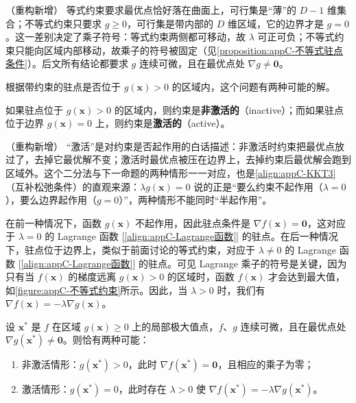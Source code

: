 \documentclass[../main.tex]{subfiles}
\begin{document}
\begin{remark}（重构新增）
等式约束要求最优点恰好落在曲面上，可行集是“薄”的 $D-1$ 维集合；不等式约束只要求 $g\geqslant0$，可行集是带内部的 $D$ 维区域，它的边界才是 $g=0$。这一差别决定了乘子符号：等式约束两侧都可移动，故 $\lambda$ 可正可负；不等式约束只能向区域内部移动，故乘子的符号被固定（见\cref{proposition:appC-不等式驻点条件}）。后文所有结论都要求 $g$ 连续可微，且在最优点处 $\nabla g\neq\bm{0}$。
\end{remark}

根据带约束的驻点是否位于 $g(\bm{x})>0$ 的区域内，这个问题有两种可能的解。

\begin{definition}[激活约束与非激活约束]\label{definition:appC-激活约束}
如果驻点位于 $g(\bm{x})>0$ 的区域内，则约束是\textbf{非激活的}（inactive）；而如果驻点位于边界 $g(\bm{x})=0$ 上，则约束是\textbf{激活的}（active）。
\end{definition}

\begin{remark}（重构新增）
“激活”是对约束是否起作用的白话描述：非激活时约束把最优点放过了，去掉它最优解不变；激活时最优点被压在边界上，去掉约束后最优解会跑到区域外。这个二分法与下一命题的两种情形一一对应，也是\eqref{align:appC-KKT3}（互补松弛条件）的直观来源：$\lambda g(\bm{x})=0$ 说的正是“要么约束不起作用（$\lambda=0$），要么边界起作用（$g=0$）”，两种情形不能同时“半起作用”。
\end{remark}

在前一种情况下，函数 $g(\bm{x})$ 不起作用，因此驻点条件是 $\nabla f(\bm{x})=\bm{0}$，这对应于 $\lambda=0$ 的 Lagrange 函数 [\eqref{align:appC-Lagrange函数}] 的驻点。在后一种情况下，驻点位于边界上，类似于前面讨论的等式约束，对应于 $\lambda\neq0$ 的 Lagrange 函数 [\eqref{align:appC-Lagrange函数}] 的驻点。可见 Lagrange 乘子的符号是关键，因为只有当 $f(\bm{x})$ 的梯度远离 $g(\bm{x})>0$ 的区域时，函数 $f(\bm{x})$ 才会达到最大值，如\cref{figure:appC-不等式约束}所示。因此，当 $\lambda>0$ 时，我们有 $\nabla f(\bm{x})=-\lambda\nabla g(\bm{x})$。

\begin{proposition}[不等式约束下驻点的两种情形]\label{proposition:appC-不等式驻点条件}
设 $\bm{x}^{*}$ 是 $f$ 在区域 $g(\bm{x})\geqslant0$ 上的局部极大值点，$f$、$g$ 连续可微，且在最优点处 $\nabla g(\bm{x}^{*})\neq\bm{0}$。则恰有两种可能：
\begin{enumerate}
  \item 非激活情形：$g(\bm{x}^{*})>0$，此时 $\nabla f(\bm{x}^{*})=\bm{0}$，且相应的乘子为零；
  \item 激活情形：$g(\bm{x}^{*})=0$，此时存在 $\lambda>0$ 使 $\nabla f(\bm{x}^{*})=-\lambda\nabla g(\bm{x}^{*})$。
\end{enumerate}
\end{proposition}
\end{document}
